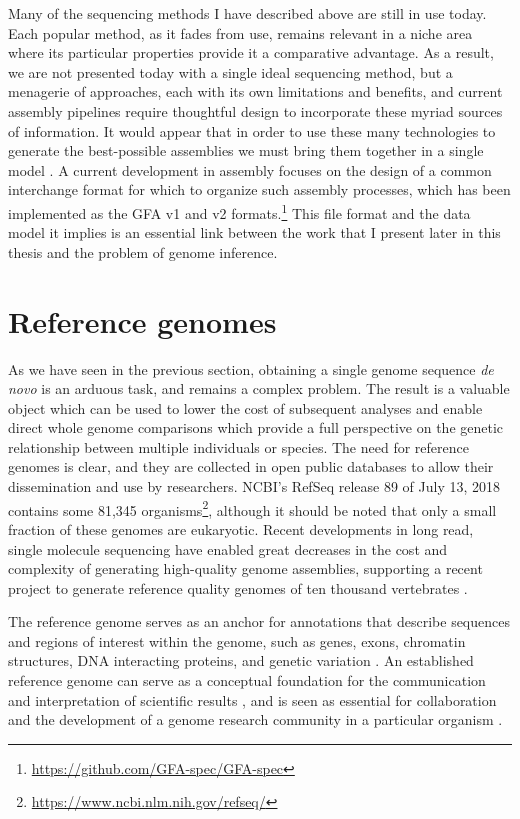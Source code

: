 Many of the sequencing methods I have described above are still in use today.
Each popular method, as it fades from use, remains relevant in a niche area where its particular properties provide it a comparative advantage.
As a result, we are not presented today with a single ideal sequencing method, but a menagerie of approaches, each with its own limitations and benefits, and current assembly pipelines require thoughtful design to incorporate these myriad sources of information.
It would appear that in order to use these many technologies to generate the best-possible assemblies we must bring them together in a single model \cite{chaisson2018multi}.
A current development in assembly focuses on the design of a common interchange format for which to organize such assembly processes, which has been implemented as the GFA v1 and v2 formats.\footnote{\url{https://github.com/GFA-spec/GFA-spec}}
This file format and the data model it implies is an essential link between the work that I present later in this thesis and the problem of genome inference.

\section{Reference genomes}

As we have seen in the previous section, obtaining a single genome sequence \emph{de novo} is an arduous task, and remains a complex problem.
The result is a valuable object which can be used to lower the cost of subsequent analyses and enable direct whole genome comparisons which provide a full perspective on the genetic relationship between multiple individuals or species.
The need for reference genomes is clear, and they are collected in open public databases to allow their dissemination and use by researchers.
NCBI's RefSeq release 89 of July 13, 2018 contains some 81,345 organisms\footnote{\url{https://www.ncbi.nlm.nih.gov/refseq/}}, although it should be noted that only a small fraction of these genomes are eukaryotic.
Recent developments in long read, single molecule sequencing have enabled great decreases in the cost and complexity of generating high-quality genome assemblies, supporting a recent project to generate reference quality genomes of ten thousand vertebrates \cite{genome2009genome,koepfli2015genome}.

The reference genome serves as an anchor for annotations that describe sequences and regions of interest within the genome, such as genes, exons, chromatin structures, DNA interacting proteins, and genetic variation \cite{sherry2001dbsnp,quinlan2010bedtools,encode2012integrated}.
An established reference genome can serve as a conceptual foundation for the communication and interpretation of scientific results \cite{kent2002human}, and is seen as essential for collaboration and the development of a genome research community in a particular organism \cite{smith1998functional,cherry1998sgd}.

